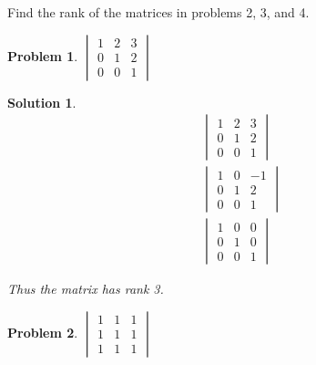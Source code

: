 \documentclass{article}
\newtheorem{problem}{Problem}
\newtheorem*{solution}{Solution}
\begin{document}
Find the rank of the matrices in problems 2, 3, and 4.

\begin{problem}
$\begin{vmatrix}
1 & 2 & 3 \\
0 & 1 & 2 \\
0 & 0 & 1
\end{vmatrix}$
\end{problem}

\begin{solution}
\begin{align*}
& \begin{vmatrix}
1 & 2 & 3 \\
0 & 1 & 2 \\
0 & 0 & 1
\end{vmatrix} \\
&\begin{vmatrix}
1 & 0 & -1 \\
0 & 1 & 2 \\
0 & 0 & 1
\end{vmatrix} \\
&\begin{vmatrix}
1 & 0 & 0 \\
0 & 1 & 0 \\
0 & 0 & 1
\end{vmatrix}
\end{align*}

Thus the matrix has rank 3.

\end{solution}

\begin{problem}
$\begin{vmatrix}
1 & 1 & 1 \\
1 & 1 & 1 \\
1 & 1 & 1
\end{vmatrix}$
\end{problem}
\end{document}
